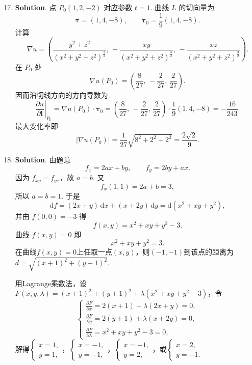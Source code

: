 \documentclass[../main.tex]{subfiles}
\begin{document}
\begin{enumerate}
    \setcounter{enumi}{16}
    \item \textbf{Solution}. 点 \(P_0(1,2,-2)\) 对应参数 \(t=1\). 曲线 \(L\) 的切向量为
          \[
              \boldsymbol{\tau}=(1,4,-8),\qquad \boldsymbol{\tau}_0=\frac{1}{9}(1,4,-8).
          \]
          计算
          \[
              \nabla u=\left(\frac{y^2+z^2}{(x^2+y^2+z^2)^\frac{3}{2}},\,-\frac{xy}{(x^2+y^2+z^2)^{\frac{3}{2}}},\,-\frac{xz}{(x^2+y^2+z^2)^{\frac{3}{2}}}\right).
          \]
          在 \(P_0\) 处
          \[
              \nabla u(P_0)=\left(\frac{8}{27},\,-\frac{2}{27},\,\frac{2}{27}\right).
          \]
          因而沿切线方向的方向导数为
          \[
              \left.\frac{\partial u}{\partial \boldsymbol{l}}\right|_{P_0}=\nabla u(P_0)\cdot \boldsymbol{\tau}_0=\left(\frac{8}{27},\,-\frac{2}{27},\,\frac{2}{27}\right)\cdot \frac{1}{9}(1,4,-8)=-\frac{16}{243}.
          \]
          最大变化率即
          \[
              |\nabla u(P_0)|=\frac{1}{27}\sqrt{8^2+2^2+2^2}=\frac{2\sqrt{2}}{9}.
          \]

    \item \textbf{Solution}. 由题意
          \[
              f_x=2ax+by,\qquad f_y=2by+ax.
          \]
          因为 \(f_{xy}=f_{yx}\)，故 \(a=b\). 又
          \[
              f_x(1,1)=2a+b=3,
          \]
          所以 \(a=b=1\). 于是
          \[
              \mathrm{d}f=(2x+y)\,\mathrm{d}x+(x+2y)\,\mathrm{d}y
              =\mathrm{d}(x^2+xy+y^2),
          \]
          并由 \(f(0,0)=-3\) 得
          \[
              f(x,y)=x^2+xy+y^2-3.
          \]
          曲线 \(f(x,y)=0\) 即
          \[
              x^2+xy+y^2=3.
          \]
          在曲线$f(x,y)=0$上任取一点$(x,y)$，则$(-1,-1)$到该点的距离为$d=\sqrt{(x+1)^2+(y+1)^2}$.

          用Lagrange乘数法，设$F(x,y,\lambda)=(x+1)^2+(y+1)^2+\lambda(x^2+xy+y^2-3)$，令
          \[
              \begin{cases}
                  \frac{\partial F}{\partial x}=2(x+1)+\lambda(2x+y)=0, \\[6pt]
                  \frac{\partial F}{\partial y}=2(y+1)+\lambda(x+2y)=0, \\[6pt]
                  \frac{\partial F}{\partial \lambda}=x^2+xy+y^2-3=0,
              \end{cases}
          \]
          解得$\begin{cases}
                  x=1, \\
                  y=1,
              \end{cases}$，$\begin{cases}
                  x=-1, \\
                  y=-1,
              \end{cases}$，$\begin{cases}
                  x=-1, \\
                  y=2,
              \end{cases}$，或$\begin{cases}
                  x=2, \\
                  y=-1.
              \end{cases}$


\end{enumerate}
\end{document}
